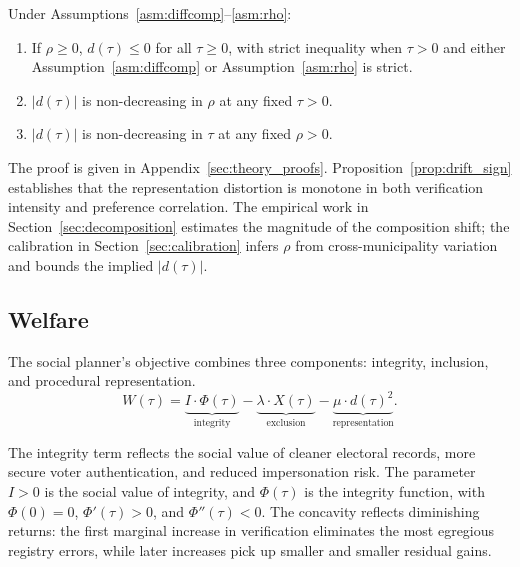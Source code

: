\begin{proposition}
\label{prop:drift_sign}
Under Assumptions~\ref{asm:diffcomp}--\ref{asm:rho}:
\begin{enumerate}
    \item[(i)] If $\rho \geq 0$, $d(\tau) \leq 0$ for all $\tau \geq 0$, with strict inequality when $\tau > 0$ and either Assumption~\ref{asm:diffcomp} or Assumption~\ref{asm:rho} is strict.
    \item[(ii)] $|d(\tau)|$ is non-decreasing in $\rho$ at any fixed $\tau > 0$.
    \item[(iii)] $|d(\tau)|$ is non-decreasing in $\tau$ at any fixed $\rho > 0$.
\end{enumerate}
\end{proposition}

The proof is given in Appendix~\ref{sec:theory_proofs}. Proposition~\ref{prop:drift_sign} establishes that the representation distortion is monotone in both verification intensity and preference correlation. The empirical work in Section~\ref{sec:decomposition} estimates the magnitude of the composition shift; the calibration in Section~\ref{sec:calibration} infers $\rho$ from cross-municipality variation and bounds the implied $|d(\tau)|$.

\subsection{Welfare}
\label{ssec:welfare}

The social planner's objective combines three components: integrity, inclusion, and procedural representation.
\begin{equation}
W(\tau) = \underbrace{I \cdot \Phi(\tau)}_{\text{integrity}} - \underbrace{\lambda \cdot X(\tau)}_{\text{exclusion}} - \underbrace{\mu \cdot d(\tau)^2}_{\text{representation}}.
\label{eq:welfare}
\end{equation}

The integrity term reflects the social value of cleaner electoral records, more secure voter authentication, and reduced impersonation risk. The parameter $I > 0$ is the social value of integrity, and $\Phi(\tau)$ is the integrity function, with $\Phi(0) = 0$, $\Phi'(\tau) > 0$, and $\Phi''(\tau) < 0$. The concavity reflects diminishing returns: the first marginal increase in verification eliminates the most egregious registry errors, while later increases pick up smaller and smaller residual gains.

